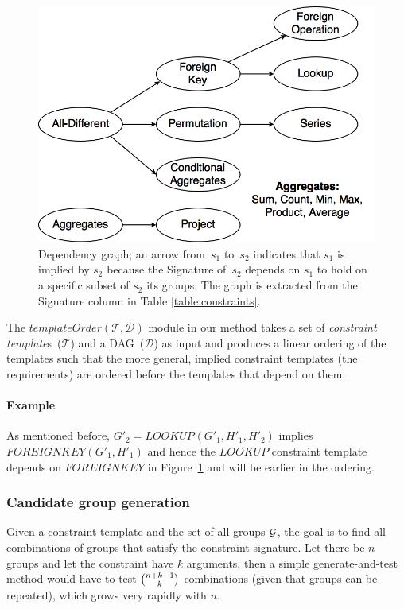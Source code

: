 \documentclass{sig-alternate-05-2015}
\newcommand{\constraints}{\ensuremath{\mathcal{T}}\xspace}
\newcommand{\format}[1]{\textit{#1}\xspace}
\newcommand{\constrainttorder}{\format{templateOrder}}
\newcommand{\template}{\format{constraint template}}
\newcommand{\CSignature}{Signature\xspace}
\newcommand{\CFunction}{Definition\xspace}
\newcommand{\dependencies}{\ensuremath{\mathcal{D}}\xspace}
\newcommand{\eccalc}[2]{\ensuremath{#1 = #2}}
\newcommand{\ecrank}[2]{\eccalc{#1}{\textit{RANK}(#2)}}
\newcommand{\ecfkey}[2]{\ensuremath{\textit{FOREIGNKEY}(#1,#2)}}
\newcommand{\eclookupf}[4]{\ensuremath{\textit{LOOKUP}_{\textit{#4}}(#1, #2, #3)}}
\newcommand{\eclookup}[4]{\eccalc{#1}{\eclookupf{#2}{#3}{#4}{}}}
\begin{document}
\begin{figure}[t]
  \centering
  \includegraphics[width=0.8\linewidth]{figures/constraint_dependency.png}
  \caption{Dependency graph; an arrow from~$s_1$ to~$s_2$ indicates that $s_1$ is implied by $s_2$ because the \CSignature of~$s_2$ depends on $s_1$ to hold on a specific subset of $s_2$ its groups.
    The graph is extracted from the Signature column in Table \ref{table:constraints}.
  }
  \label{fig:learning_order}
\end{figure}

The $\constrainttorder(\constraints,\dependencies)$ module in our method takes a set of {\template}s~(\constraints) and a DAG~(\dependencies) as input and produces a linear ordering of the templates such that the more general, implied constraint templates (the requirements) are ordered before the templates that depend on them.

\paragraph{Example}
As mentioned before, $\eclookup{G'_2}{G'_1}{H'_1}{H'_2}$ implies $\ecfkey{G'_1}{H'_1}$ and hence the $LOOKUP$ constraint template depends on $FOREIGNKEY$ in Figure~\ref{fig:learning_order} and will be earlier in the ordering.


\subsubsection{Candidate group generation}
Given a constraint template and the set of all groups ${\cal G}$, the goal is to find all combinations of groups that satisfy the constraint signature. Let there be $n$ groups and let the constraint have $k$ arguments, then a simple generate-and-test method would have to test $\tbinom{n+k-1}{k}$ combinations (given that groups can be repeated), which grows very rapidly with $n$.
\end{document}
